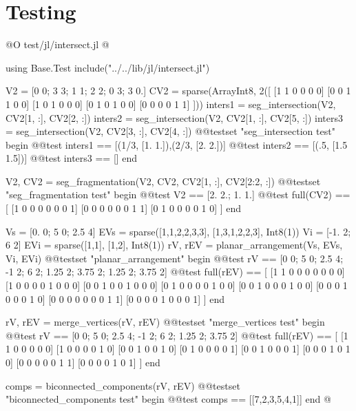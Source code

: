 \documentclass[10pt,oneside]{article}
\begin{document}
\section{Testing}
@O test/jl/intersect.jl
@{using Base.Test
include("../../lib/jl/intersect.jl")

V2 = [0 0; 3 3; 1 1; 2 2; 0 3; 3 0.]
CV2 = sparse(Array{Int8, 2}([
    [1 1 0 0 0 0]
    [0 0 1 1 0 0]
    [1 0 1 0 0 0]
    [0 1 0 1 0 0]
    [0 0 0 0 1 1]
]))
inters1 = seg_intersection(V2, CV2[1, :], CV2[2, :])
inters2 = seg_intersection(V2, CV2[1, :], CV2[5, :])
inters3 = seg_intersection(V2, CV2[3, :], CV2[4, :])
@@testset "seg_intersection test" begin
    @@test inters1 == [(1/3, [1. 1.]),(2/3, [2. 2.])]
    @@test inters2 == [(.5, [1.5 1.5])]
    @@test inters3 == []
end

V2, CV2 = seg_fragmentation(V2, CV2, CV2[1, :], CV2[2:2, :])
@@testset "seg_fragmentation test" begin
    @@test V2 == [2. 2.; 1. 1.]
    @@test full(CV2) == [
        [1 0 0 0 0 0 0 1]
        [0 0 0 0 0 0 1 1]
        [0 1 0 0 0 0 1 0]
    ] 
end

Vs = [0. 0; 5 0; 2.5 4]
EVs = sparse([1,1,2,2,3,3], [1,3,1,2,2,3], Int8(1))
Vi = [-1. 2; 6 2]
EVi = sparse([1,1], [1,2], Int8(1))
rV, rEV = planar_arrangement(Vs, EVs, Vi, EVi)
@@testset "planar_arrangement" begin
    @@test rV == [0 0; 5 0; 2.5 4; -1 2; 6 2; 1.25 2; 3.75 2; 1.25 2; 3.75 2]
    @@test full(rEV) == [
        [1 1 0 0 0 0 0 0 0]
        [1 0 0 0 0 1 0 0 0]
        [0 0 1 0 0 1 0 0 0]
        [0 1 0 0 0 0 1 0 0]
        [0 0 1 0 0 0 1 0 0]
        [0 0 0 1 0 0 0 1 0]
        [0 0 0 0 0 0 0 1 1]
        [0 0 0 0 1 0 0 0 1]
    ]
end


rV, rEV = merge_vertices(rV, rEV)
@@testset "merge_vertices test" begin
    @@test rV == [0 0; 5 0; 2.5 4; -1 2; 6 2; 1.25 2; 3.75 2]
    @@test full(rEV) == [
        [1 1 0 0 0 0 0]
        [1 0 0 0 0 1 0]
        [0 0 1 0 0 1 0]
        [0 1 0 0 0 0 1]
        [0 0 1 0 0 0 1]
        [0 0 0 1 0 1 0]
        [0 0 0 0 0 1 1]
        [0 0 0 0 1 0 1]
    ]
end

comps = biconnected_components(rV, rEV)
@@testset "biconnected_components test" begin
    @@test comps == [[7,2,3,5,4,1]]
end
@}
\end{document}
